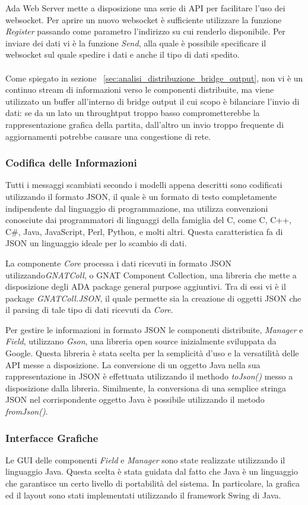 Ada Web Server mette a disposizione una serie di API per facilitare l'uso dei websocket. Per aprire un nuovo websocket \`{e} sufficiente utilizzare la funzione \emph{Register} passando come parametro l'indirizzo su cui renderlo disponibile. Per inviare dei dati vi \`{e} la funzione \emph{Send}, alla quale \`{e} possibile specificare il websocket sul quale spedire i dati e anche il tipo di dati spedito.\\\\
Come spiegato in sezione ~\ref{sec:analisi_distribuzione_bridge_output}, non vi \`{e} un continuo stream di informazioni verso le componenti distribuite, ma viene utilizzato un buffer all'interno di bridge output il cui scopo \`{e} bilanciare l'invio di dati: se da un lato un throughtput troppo basso comprometterebbe la rappresentazione grafica della partita, dall'altro un invio troppo frequente di aggiornamenti potrebbe causare una congestione di rete.

\subsubsection{Codifica delle Informazioni}
Tutti i messaggi scambiati secondo i modelli appena descritti sono codificati utilizzando il formato JSON, il quale \`{e} un formato di testo completamente indipendente dal linguaggio di programmazione, ma utilizza convenzioni conosciute dai programmatori di linguaggi della famiglia del C, come C, C++, C\#, Java, JavaScript, Perl, Python, e molti altri. Questa caratteristica fa di JSON un linguaggio ideale per lo scambio di dati. 

La componente \emph{Core} processa i dati ricevuti in formato JSON utilizzando\emph{GNATColl}, o GNAT Component Collection, una libreria che mette a disposizione degli ADA package general purpose aggiuntivi. Tra di essi vi \`{e} il package \emph{GNATColl.JSON}, il quale permette sia la creazione di oggetti JSON che il parsing di tale tipo di dati ricevuti da \emph{Core}.

Per gestire le informazioni in formato JSON le componenti distribuite, \emph{Manager} e \emph{Field}, utilizzano \emph{Gson}, una libreria open source  inizialmente sviluppata da Google. Questa libreria \`{e} stata scelta per la semplicit\`{a} d'uso e la versatilit\`{a} delle API messe a disposizione. La conversione di un oggetto Java nella sua rappresentazione in JSON \`{e} effettuata utilizzando il methodo \emph{toJson()} messo a disposizione dalla libreria. Similmente, la conversiona di una semplice stringa JSON nel corrispondente oggetto Java \`{e} possibile utilizzando il metodo \emph{fromJson()}. 

\subsubsection{Interfacce Grafiche}
Le GUI delle componenti \emph{Field} e \emph{Manager} sono state realizzate utilizzando il linguaggio Java. Questa scelta \`{e} stata guidata dal fatto che Java \`{e} un linguaggio che garantisce un certo livello di portabilit\`{a} del sistema. In particolare, la grafica ed il layout sono stati implementati utilizzando il framework Swing di Java.
